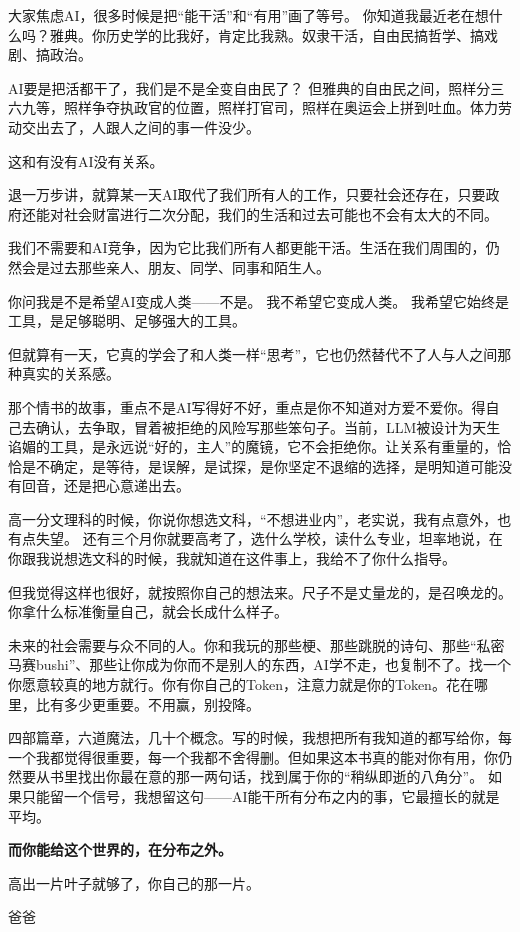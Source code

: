 \vspace{1em}

大家焦虑AI，很多时候是把“能干活”和“有用”画了等号。
你知道我最近老在想什么吗？雅典。你历史学的比我好，肯定比我熟。奴隶干活，自由民搞哲学、搞戏剧、搞政治。

\vspace{1em}

AI要是把活都干了，我们是不是全变自由民了？
但雅典的自由民之间，照样分三六九等，照样争夺执政官的位置，照样打官司，照样在奥运会上拼到吐血。体力劳动交出去了，人跟人之间的事一件没少。

\vspace{1em}

这和有没有AI没有关系。

退一万步讲，就算某一天AI取代了我们所有人的工作，只要社会还存在，只要政府还能对社会财富进行二次分配，我们的生活和过去可能也不会有太大的不同。

我们不需要和AI竞争，因为它比我们所有人都更能干活。生活在我们周围的，仍然会是过去那些亲人、朋友、同学、同事和陌生人。

\vspace{1em}

你问我是不是希望AI变成人类——不是。
我不希望它变成人类。
我希望它始终是工具，是足够聪明、足够强大的工具。

\newpage

但就算有一天，它真的学会了和人类一样“思考”，它也仍然替代不了人与人之间那种真实的关系感。

那个情书的故事，重点不是AI写得好不好，重点是你不知道对方爱不爱你。得自己去确认，去争取，冒着被拒绝的风险写那些笨句子。当前，LLM被设计为天生谄媚的工具，是永远说“好的，主人”的魔镜，它不会拒绝你。让关系有重量的，恰恰是不确定，是等待，是误解，是试探，是你坚定不退缩的选择，是明知道可能没有回音，还是把心意递出去。

\vspace{1em}

高一分文理科的时候，你说你想选文科，“不想进业内”，老实说，我有点意外，也有点失望。
还有三个月你就要高考了，选什么学校，读什么专业，坦率地说，在你跟我说想选文科的时候，我就知道在这件事上，我给不了你什么指导。

但我觉得这样也很好，就按照你自己的想法来。尺子不是丈量龙的，是召唤龙的。你拿什么标准衡量自己，就会长成什么样子。


未来的社会需要与众不同的人。你和我玩的那些梗、那些跳脱的诗句、那些“私密马赛bushi”、那些让你成为你而不是别人的东西，AI学不走，也复制不了。找一个你愿意较真的地方就行。你有你自己的Token，注意力就是你的Token。花在哪里，比有多少更重要。不用赢，别投降。

\vspace{1em}

四部篇章，六道魔法，几十个概念。写的时候，我想把所有我知道的都写给你，每一个我都觉得很重要，每一个我都不舍得删。但如果这本书真的能对你有用，你仍然要从书里找出你最在意的那一两句话，找到属于你的“稍纵即逝的八角分”。
如果只能留一个信号，我想留这句——AI能干所有分布之内的事，它最擅长的就是平均。

\vspace{1em}

\textbf{而你能给这个世界的，在分布之外。}

高出一片叶子就够了，你自己的那一片。

\vspace{2em}
\begin{flushright}
爸爸
\end{flushright}
